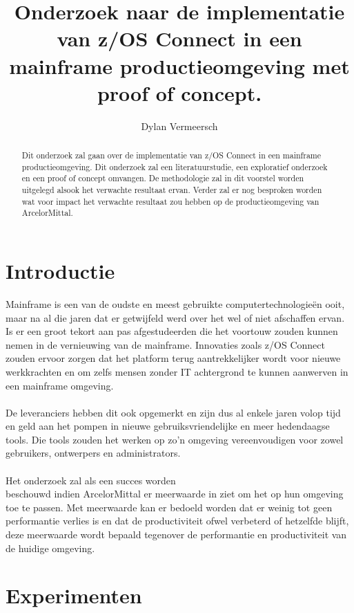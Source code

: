 \documentclass[a0,portrait]{hogent-poster}
\title{Onderzoek naar de implementatie van z/OS Connect in een mainframe productieomgeving met proof of concept.}
\author{Dylan Vermeersch}
\begin{document}
\maketitle

\begin{abstract}
Dit onderzoek zal gaan over de implementatie van z/OS Connect in een mainframe productieomgeving. Dit onderzoek zal een literatuurstudie, een exploratief onderzoek en een proof of concept omvangen. De methodologie zal in dit voorstel worden uitgelegd alsook het verwachte resultaat ervan. Verder zal er nog besproken worden wat voor impact het verwachte resultaat zou hebben op de productieomgeving van ArcelorMittal.
\end{abstract}

\begin{multicols}{2}

\section{Introductie}

Mainframe is een van de oudste en meest gebruikte computertechnologieën ooit, maar na al die jaren dat er getwijfeld werd over het wel of niet afschaffen ervan. Is er een groot tekort aan pas afgestudeerden die het voortouw zouden kunnen nemen in de vernieuwing van de mainframe. Innovaties zoals z/OS Connect zouden ervoor zorgen dat het platform terug aantrekkelijker wordt voor nieuwe werkkrachten en om zelfs mensen zonder IT achtergrond te kunnen aanwerven in een mainframe omgeving.
\\ \\
De leveranciers hebben dit ook opgemerkt en zijn dus al enkele jaren volop tijd en geld aan het pompen in nieuwe gebruiksvriendelijke en meer hedendaagse tools. Die tools zouden het werken op zo'n omgeving vereenvoudigen voor zowel gebruikers, ontwerpers en administrators.
\\ \\
Het onderzoek zal als een succes worden \\beschouwd indien ArcelorMittal er meerwaarde in ziet om het op hun omgeving toe te passen. Met meerwaarde kan er bedoeld worden dat er weinig tot geen performantie verlies is en dat de productiviteit ofwel verbeterd of hetzelfde blijft, deze meerwaarde wordt bepaald tegenover de performantie en productiviteit van de huidige omgeving.

\section{Experimenten}


\end{multicols}
\end{document}
